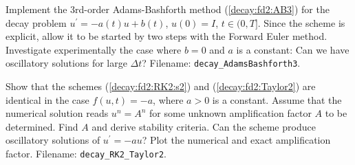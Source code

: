 \documentclass[graybox,sectrefs,envcountresetchap,open=right,final]{svmonodo}
\makeatletter
\newenvironment{doconceexercise}{}{}
\newcounter{doconceexercisecounter}%
\newcommand\listofexercises{
\chapter*{List of Exercises, Problems, and Projects
          \@mkboth{List of Exercises, Problems, and Projects}{List of Exercises, Problems, and Projects}}
\markboth{List of Exercises, Problems, and Projects}{List of Exercises, Problems, and Projects}
\@starttoc{loe}
}
\makeatother
\begin{document}
\begin{doconceexercise}

                
\label{decay:fd2:exer:AB3}

Implement the 3rd-order Adams-Bashforth method (\ref{decay:fd2:AB3})
for the decay problem $u^{\prime}=-a(t)u + b(t)$, $u(0)=I$, $t\in (0, T]$.
Since the scheme is explicit, allow it to be started by two steps with
the Forward Euler method.  Investigate experimentally the case where
$b=0$ and $a$ is a constant: Can we have oscillatory solutions for
large $\Delta t$?
\noindent Filename: \Verb!decay_AdamsBashforth3!.

\end{doconceexercise}

\begin{doconceexercise}

                
\label{decay:exer:RK2:Taylor:analysis}

Show that the schemes (\ref{decay:fd2:RK2:s2}) and
(\ref{decay:fd2:Taylor2}) are identical in the case $f(u,t)=-a$, where
$a>0$ is a constant. Assume that the numerical solution reads
$u^n=A^n$ for some unknown amplification factor $A$ to be determined.
Find $A$ and derive stability criteria. Can the scheme produce
oscillatory solutions of $u^{\prime}=-au$? Plot the numerical and exact
amplification factor.
\noindent Filename: \Verb!decay_RK2_Taylor2!.

\end{doconceexercise}
\end{document}
